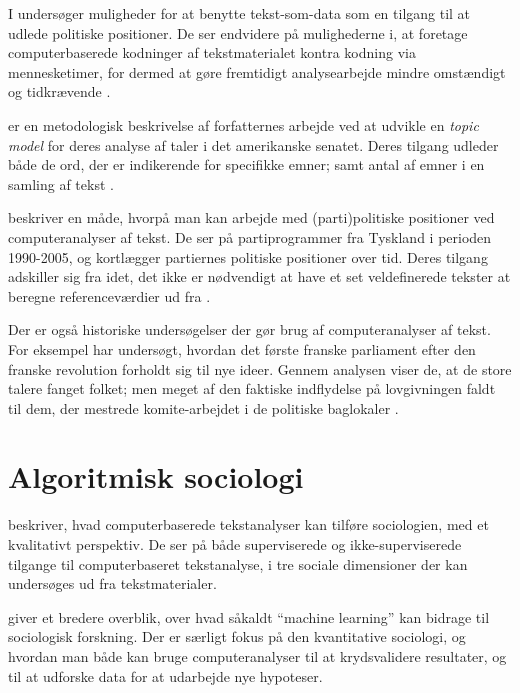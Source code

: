 I  undersøger \citeauthor{laverExtractingPolicyPositions2003} muligheder for at benytte tekst-som-data som en tilgang til at udlede politiske positioner.
De ser endvidere på mulighederne i, at foretage computerbaserede kodninger af tekstmaterialet kontra kodning via mennesketimer, for dermed at gøre fremtidigt analysearbejde mindre omstændigt og tidkrævende \autocite{laverExtractingPolicyPositions2003}.

 er en metodologisk beskrivelse af forfatternes arbejde ved at udvikle en \textit{topic model} for deres analyse af taler i det amerikanske senatet.
Deres tilgang udleder både de ord, der er indikerende for specifikke emner; samt antal af emner i en samling af tekst \autocite{quinnHowAnalyzePolitical2010}.

\citeauthor{slapinScalingModelEstimating2008} beskriver en måde, hvorpå man kan arbejde med (parti)politiske positioner ved computeranalyser af tekst.
De ser på partiprogrammer fra Tyskland i perioden 1990-2005, og kortlægger partiernes politiske positioner over tid.
Deres tilgang adskiller sig fra \citeauthor{laverExtractingPolicyPositions2003} idet, det ikke er nødvendigt at have et set veldefinerede tekster at beregne referenceværdier ud fra \autocite{slapinScalingModelEstimating2008}.

Der er også historiske undersøgelser der gør brug af computeranalyser af tekst.
For eksempel har \citeauthor{barronIndividualsInstitutionsInnovation2018} undersøgt, hvordan det første franske parliament efter den franske revolution forholdt sig til nye ideer.
Gennem analysen viser de, at de store talere fanget folket; men meget af den faktiske indflydelse på lovgivningen faldt til dem, der mestrede komite-arbejdet i de politiske baglokaler \autocite{barronIndividualsInstitutionsInnovation2018}. 

\section{Algoritmisk sociologi}\label{sec:review-compsoc}

\cite{evansMachineTranslationMining2016} beskriver, hvad computerbaserede tekstanalyser kan tilføre sociologien, med et kvalitativt perspektiv.
De ser på både superviserede og ikke-superviserede tilgange til computerbaseret tekstanalyse, i tre sociale dimensioner der kan undersøges ud fra tekstmaterialer.

 \cite{molinaMachineLearningSociology2019} giver et bredere overblik, over hvad såkaldt “machine learning” kan bidrage til sociologisk forskning.
Der er særligt fokus på den kvantitative sociologi, og hvordan man både kan bruge computeranalyser til at krydsvalidere resultater, og til at udforske data for at udarbejde nye hypoteser.

